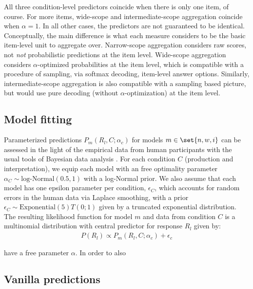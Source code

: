 \documentclass{article}
\begin{document}
All three condition-level predictors coincide when there is only one item, of course.
For more items, wide-scope and intermediate-scope aggregation coincide when $\alpha = 1$.
In all other cases, the predictors are not guaranteed to be identical.
Conceptually, the main difference is what each measure considers to be the basic item-level unit to aggregate over.
Narrow-scope aggregation considers raw scores, not \emph{not} probabilistic predictions at the item level.
Wide-scope aggregation considers $\alpha$-optimized probabilities at the item level, which is compatible with a procedure of sampling, via softmax decoding, item-level answer options.
Similarly, intermediate-scope aggregation is also compatible with a sampling based picture, but would use pure decoding (without $\alpha$-optimization) at the item level.

\subsection{Model fitting}
\label{sec:model-fitting}

Parameterized predictions $P_{m}(R_{l}, C ; \alpha_{c})$ for models $m \in \set{n,w,i}$ can be assessed in the light of the empirical data from human participants with the usual tools of Bayesian data analysis \citep[e.g.][]{GelmanCarlin2014:Bayesian-Data-A,McElreath2016:Statistical-Ret,Lambert2018:A-Students-Guid}.
For each condition $C$ (production and interpretation), we equip each model with an free optimality parameter $\alpha_{C}\sim \text{log-Normal}(0.5,1)$ with a log-Normal prior.
We also assume that each model has one epsilon parameter per condition, $\epsilon_{C}$, which accounts for random errors in the human data via Laplace smoothing, with a prior $\epsilon_{C} \sim \text{Exponential}(5) T(0;1)$ given by a truncated exponential distribution.
The resulting likelihood function for model $m$ and data from condition $C$ is a multinomial distribution with central predictor for response $R_{l}$ given by:
%
\begin{align*}
  P(R_{l}) \propto P_{m}(R_{l}, C; \alpha_{c}) +  \epsilon_{c}
\end{align*}

have a free parameter $\alpha$.
In order to also


\newpage

\subsection{Vanilla predictions}
\label{sec:vanilla-predictions}
\end{document}
